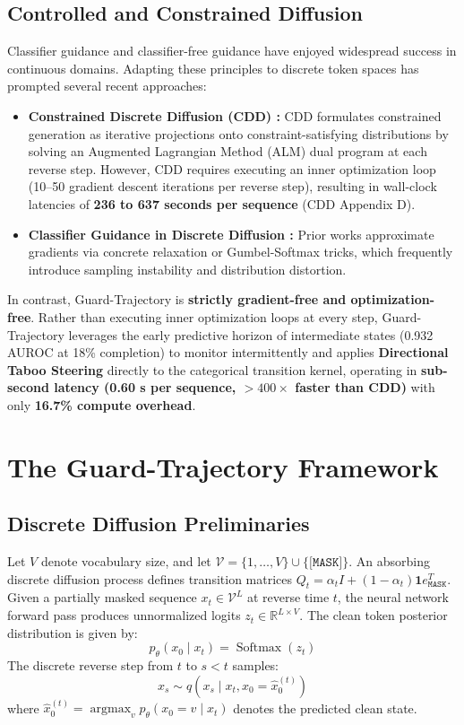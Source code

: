 \documentclass[conference]{IEEEtran}
\begin{document}
\subsection{Controlled and Constrained Diffusion}
Classifier guidance \cite{dhariwal2021diffusion} and classifier-free guidance \cite{ho2022classifier} have enjoyed widespread success in continuous domains. Adapting these principles to discrete token spaces has prompted several recent approaches:
\begin{itemize}
    \item \textbf{Constrained Discrete Diffusion (CDD) \cite{cardei2025cdd}:} CDD formulates constrained generation as iterative projections onto constraint-satisfying distributions by solving an Augmented Lagrangian Method (ALM) dual program at each reverse step. However, CDD requires executing an inner optimization loop (10--50 gradient descent iterations per reverse step), resulting in wall-clock latencies of \textbf{236 to 637 seconds per sequence} (CDD Appendix D).
    \item \textbf{Classifier Guidance in Discrete Diffusion \cite{he2023diffusion,lou2023discrete}:} Prior works approximate gradients via concrete relaxation or Gumbel-Softmax tricks, which frequently introduce sampling instability and distribution distortion.
\end{itemize}
In contrast, Guard-Trajectory is \textbf{strictly gradient-free and optimization-free}. Rather than executing inner optimization loops at every step, Guard-Trajectory leverages the early predictive horizon of intermediate states (0.932 AUROC at 18\% completion) to monitor intermittently and applies \textbf{Directional Taboo Steering} directly to the categorical transition kernel, operating in \textbf{sub-second latency (0.60 s per sequence, $>400\times$ faster than CDD)} with only \textbf{16.7\% compute overhead}.

\section{The Guard-Trajectory Framework}

\subsection{Discrete Diffusion Preliminaries}
Let $V$ denote vocabulary size, and let $\mathcal{V} = \{1, \dots, V\} \cup \{\texttt{[MASK]}\}$. An absorbing discrete diffusion process defines transition matrices $Q_t = \alpha_t I + (1 - \alpha_t) \mathbf{1} e_{\texttt{MASK}}^T$. Given a partially masked sequence $x_t \in \mathcal{V}^L$ at reverse time $t$, the neural network forward pass produces unnormalized logits $z_t \in \mathbb{R}^{L \times V}$. The clean token posterior distribution is given by:
\begin{equation}
    p_\theta(x_0 \mid x_t) = \operatorname{Softmax}(z_t)
\end{equation}
The discrete reverse step from $t$ to $s < t$ samples:
\begin{equation}
    x_s \sim q(x_s \mid x_t, x_0 = \hat{x}_0^{(t)})
\end{equation}
where $\hat{x}_0^{(t)} = \operatorname{argmax}_{v} p_\theta(x_0 = v \mid x_t)$ denotes the predicted clean state.
\end{document}
